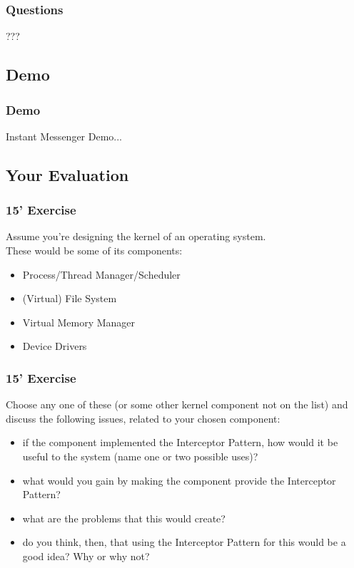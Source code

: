 \documentclass{beamer}
\begin{document}
\begin{frame}
  \frametitle{Questions}

  \begin{center}
  ???
  \end{center}

\end{frame}

\subsection{Demo}

\begin{frame}
  \frametitle{Demo}

  Instant Messenger Demo...
\end{frame}

\subsection{Your Evaluation}

\begin{frame}
  \frametitle{15' Exercise}

  Assume you're designing the kernel of an operating system. \\
  These would be some of its components:
  \begin{itemize}
  \item Process/Thread Manager/Scheduler
  \item (Virtual) File System
  \item Virtual Memory Manager
  \item Device Drivers
  \end{itemize}

\end{frame}

\begin{frame}
  \frametitle{15' Exercise}

  Choose any one of these (or some other kernel component not on the
  list) and discuss the following issues, related to your chosen component:
  \begin{itemize}
  \item if the component implemented the Interceptor Pattern, how would
            it be useful to the system (name one or two possible uses)?
  \item what would you gain by making the component provide the Interceptor
            Pattern?
  \item what are the problems that this would create?
  \item do you think, then, that using the Interceptor Pattern for this would
            be a good idea? Why or why not?
  \end{itemize}

\end{frame}
\end{document}
